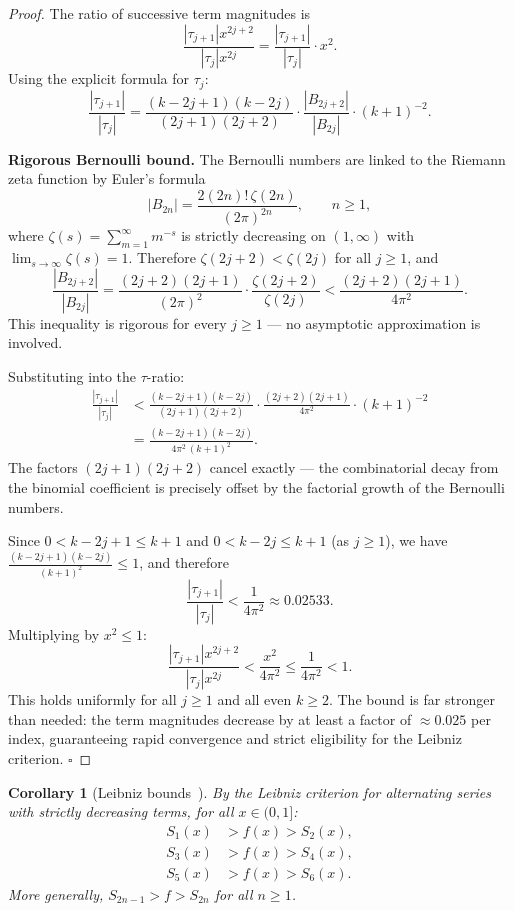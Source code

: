 \documentclass[12pt,a4paper]{article}
\theoremstyle{plain}
\newtheorem{corollary}[theorem]{Corollary}
\theoremstyle{definition}
\begin{document}
\begin{proof}
  The ratio of successive term magnitudes is
  \[
    \frac{|\tau_{j+1}|x^{2j+2}}{|\tau_j|x^{2j}}
    = \frac{|\tau_{j+1}|}{|\tau_j|} \cdot x^2.
  \]
  Using the explicit formula for $\tau_j$:
  \[
    \frac{|\tau_{j+1}|}{|\tau_j|}
    = \frac{(k-2j+1)(k-2j)}{(2j+1)(2j+2)}
      \cdot \frac{|B_{2j+2}|}{|B_{2j}|}
      \cdot (k+1)^{-2}.
  \]

  \textbf{Rigorous Bernoulli bound.}
  The Bernoulli numbers are linked to the Riemann zeta function by Euler's
  formula~\cite{Euler}
  \[
    |B_{2n}| = \frac{2(2n)!\,\zeta(2n)}{(2\pi)^{2n}},
    \qquad n \ge 1,
  \]
  where $\zeta(s) = \sum_{m=1}^{\infty} m^{-s}$ is strictly decreasing
  on $(1,\infty)$ with $\lim_{s\to\infty}\zeta(s)=1$.
  Therefore $\zeta(2j+2) < \zeta(2j)$ for all $j \ge 1$, and
  \[
    \frac{|B_{2j+2}|}{|B_{2j}|}
    = \frac{(2j+2)(2j+1)}{(2\pi)^2}
      \cdot \frac{\zeta(2j+2)}{\zeta(2j)}
    < \frac{(2j+2)(2j+1)}{4\pi^2}.
  \]
  This inequality is rigorous for every $j \ge 1$ --- no asymptotic
  approximation is involved.

  Substituting into the $\tau$-ratio:
  \begin{align*}
    \frac{|\tau_{j+1}|}{|\tau_j|}
    &< \frac{(k-2j+1)(k-2j)}{(2j+1)(2j+2)}
       \cdot \frac{(2j+2)(2j+1)}{4\pi^2}
       \cdot (k+1)^{-2} \\[4pt]
    &= \frac{(k-2j+1)(k-2j)}{4\pi^2\,(k+1)^2}.
  \end{align*}
  The factors $(2j+1)(2j+2)$ cancel exactly --- the combinatorial
  decay from the binomial coefficient is precisely offset by the
  factorial growth of the Bernoulli numbers.

  Since $0 < k-2j+1 \le k+1$ and $0 < k-2j \le k+1$
  (as $j \ge 1$), we have
  $\frac{(k-2j+1)(k-2j)}{(k+1)^2} \le 1$, and therefore
  \[
    \frac{|\tau_{j+1}|}{|\tau_j|}
    < \frac{1}{4\pi^2}
    \approx 0.02533.
  \]
  Multiplying by $x^2 \le 1$:
  \[
    \frac{|\tau_{j+1}|x^{2j+2}}{|\tau_j|x^{2j}}
    < \frac{x^2}{4\pi^2}
    \le \frac{1}{4\pi^2}
    < 1.
  \]
  This holds uniformly for all $j \ge 1$ and all even $k \ge 2$.
  The bound is far stronger than needed: the term magnitudes decrease
  by at least a factor of $\approx 0.025$ per index, guaranteeing rapid
  convergence and strict eligibility for the Leibniz criterion.
  \hfill$\square$
\end{proof}

\begin{corollary}[Leibniz bounds~\cite{Leibniz}]\label{cor:leibniz-bounds}
  By the Leibniz criterion for alternating series with strictly
  decreasing terms, for all $x \in (0,1]$:
  \begin{align}
    S_1(x) &> f(x) > S_2(x), \label{eq:leibniz-2term} \\
    S_3(x) &> f(x) > S_4(x), \label{eq:leibniz-4term} \\
    S_5(x) &> f(x) > S_6(x). \label{eq:leibniz-6term}
  \end{align}
  More generally, $S_{2n-1} > f > S_{2n}$ for all $n \ge 1$.
\end{corollary}
\end{document}
